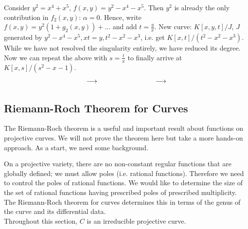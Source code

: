 \documentclass[a4paper,11pt]{article}
\begin{document}
{				\begin{eg}
					Consider $y^2=x^4+x^5$, $f(x,y)=y^2-x^4-x^5$. Then $y^2$ is already the only contribution in $f_2(x,y)$: $\alpha=0$. Hence, write $f(x,y)=y^2(1+g_2(x,y))+\dots$ and add $t=\frac{y}{x}$. New curve: $K[x,y,t]/J$, $J$ generated by $y^2-x^4-x^5, xt=y, t^2-x^2-x^3$, i.e. get $K[x,t]/(t^2-x^2-x^3)$.
					While we have not resolved the singularity entirely, we have reduced its degree. Now we can repeat the above with $s=\frac{t}{x}$ to finally arrive at $K[x,s]/(s^2-x-1)$.
					\begin{equation*}
						\tikz[scale=1,baseline=-.1cm]{\draw[thick,black]plot[smooth] file {plots/ccubic1.table};\draw[thick,black]plot[smooth] file {plots/ccubic2.table}}\hspace{4em}\longrightarrow\hspace{4em}
						\tikz[scale=1,baseline=-.1cm]{\draw[thick,black]plot[smooth] file {plots/cubic1.table};\draw[thick,black]plot[smooth] file {plots/cubic2.table}}\hspace{4em}\longrightarrow\hspace{4em}
						\tikz[scale=1,baseline=-.1cm]{\draw[thick,black]plot[smooth] file {plots/para1.table};\draw[thick,black]plot[smooth] file {plots/para2.table}}
					\end{equation*}
				\end{eg}
			}

		\subsection{Riemann-Roch Theorem for Curves}\label{subsec--RiemannRoch}
				
			The Riemann-Roch theorem is a useful and important result about functions on projective curves. We will not prove the theorem here but take a more hands-on approach. As a start, we need some background.

			On a projective variety, there are no non-constant regular functions that are globally defined; we must allow poles (i.e. rational functions). Therefore we need to control the poles of rational functions. We would like to determine the size of the set of rational functions having prescribed poles of prescribed multiplicity. The Riemann-Roch theorem for curves determines this in terms of the genus of the curve and its differential data.
			\\

			Throughout this section, $C$ is an irreducible projective curve.
\end{document}
